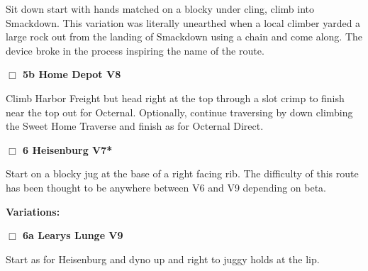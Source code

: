 \begin{multicols}{2}
\begin{adjustwidth}{0.5cm}{}
\begin{adjustwidth}{1.3em}{}
Sit down start with hands matched on a blocky under cling, climb into Smackdown. This variation was literally unearthed when a local climber yarded a large rock out from the landing of Smackdown using a chain and come along. The device broke in the process inspiring the name of the route.
\end{adjustwidth}




\needspace{2em}
\label{vr:Harbor Freight Right Exit}
\colorbox{Goldenrod!20}{
\parbox{0.95\linewidth}{
\hspace{-1ex}\textbf{$\Box$
5b Home Depot V8  
}}}
\begin{adjustwidth}{1.3em}{}			

Climb Harbor Freight but head right at the top through a slot crimp to finish near the top out for Octernal. Optionally, continue traversing by down climbing the Sweet Home Traverse and finish as for Octernal Direct.
\end{adjustwidth}



\end{adjustwidth}


\needspace{2em}
\label{rt:Heisenburg}
\colorbox{Goldenrod!20}{
\parbox{0.95\linewidth}{
\hspace{-1ex}\textbf{$\Box$
6 Heisenburg V7*  
}}}
\begin{adjustwidth}{1.3em}{}			

Start on a blocky jug at the base of a right facing rib. The difficulty of this route has been thought to be anywhere between V6 and V9 depending on beta.
\end{adjustwidth}


\begin{adjustwidth}{0.5cm}{}				
\needspace{4em}
\textbf{Variations:} \newline

\needspace{2em}
\label{vr:Learys Lunge}
\colorbox{Goldenrod!20}{
\parbox{0.95\linewidth}{
\hspace{-1ex}\textbf{$\Box$
6a Learys Lunge V9  
}}}
\begin{adjustwidth}{1.3em}{}			

Start as for Heisenburg and dyno up and right to juggy holds at the lip.
\end{adjustwidth}



\end{adjustwidth}



\end{multicols}
